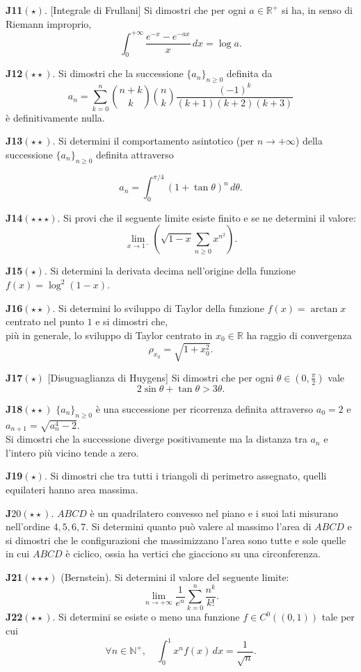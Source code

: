 \documentclass[a4paper,twoside]{article}
\theoremstyle{definition}
\numberwithin{theorem}{section}
\begin{document}
\textbf{J11}$(\star)$. [Integrale di Frullani] Si dimostri che per ogni $a\in\mathbb{R}^+$ si ha, in senso di Riemann improprio,
$$ \int_{0}^{+\infty}\frac{e^{-x}-e^{-ax}}{x}\,dx = \log a.$$

\textbf{J12}$(\star\star)$. Si dimostri che la successione $\{a_n\}_{n\geq 0}$ definita da
$$ a_n = \sum_{k=0}^{n}\binom{n+k}{k}\binom{n}{k}\frac{(-1)^k}{(k+1)(k+2)(k+3)} $$
è definitivamente nulla.

\textbf{J13}$(\star\star)$. Si determini il comportamento asintotico (per $n\to +\infty$) della successione $\{a_n\}_{n\geq 0}$ definita attraverso

$$ a_n = \int_{0}^{\pi/4}\left(1+\tan\theta\right)^n\,d\theta. $$

\textbf{J14}$(\star\star\star)$. Si provi che il seguente limite esiste finito e se ne determini il valore:
$$ \lim_{x\to 1^-}\left(\sqrt{1-x}\sum_{n\geq 0}x^{n^2}\right).$$

\textbf{J15}$(\star)$. Si determini la derivata decima nell'origine della funzione $f(x)=\log^2(1-x)$.

\textbf{J16}$(\star\star)$. Si determini lo sviluppo di Taylor della funzione $f(x)=\arctan x$ centrato nel punto $1$ e si dimostri che,\\ più in generale, lo sviluppo di Taylor centrato in $x_0\in\mathbb{R}$ ha raggio di convergenza 
$$ \rho_{x_0} = \sqrt{1+x_0^2}. $$

{\label{J17}\textbf{J17}}$(\star)$ [Disuguaglianza di Huygens] Si dimostri che per ogni $\theta\in\left(0,\frac{\pi}{2}\right)$ vale
$$ 2\sin\theta + \tan\theta > 3\theta.$$

\textbf{J18}$(\star\star)$ $\{a_n\}_{n\geq 0}$ è una successione per ricorrenza definita attraverso $a_0=2$ e $a_{n+1}=\sqrt{a_n^4-2}$.\\ Si dimostri che la successione diverge positivamente ma la distanza tra $a_n$ e l'intero più vicino tende a zero.

\textbf{J19}$(\star)$. Si dimostri che tra tutti i triangoli di perimetro assegnato, quelli equilateri hanno area massima. 

\textbf{J}20$(\star\star)$. $ABCD$ è un quadrilatero convesso nel piano e i suoi lati misurano nell'ordine $4,5,6,7$. Si determini quanto può valere al massimo l'area di $ABCD$ e si dimostri che le configurazioni che massimizzano l'area sono tutte e sole quelle in cui $ABCD$ è ciclico, ossia ha vertici che giacciono su una circonferenza.

\textbf{J21}$(\star\star\star)$ (Bernstein). Si determini il valore del seguente limite: 
$$ \lim_{n\to +\infty} \frac{1}{e^n}\sum_{k=0}^{n}\frac{n^k}{k!}.$$
\textbf{J22}$(\star\star)$. Si determini se esiste o meno una funzione $f\in C^0((0,1))$ tale per cui
$$ \forall n\in\mathbb{N}^+,\quad \int_{0}^{1} x^n f(x)\,dx = \frac{1}{\sqrt{n}}. $$
\end{document}
